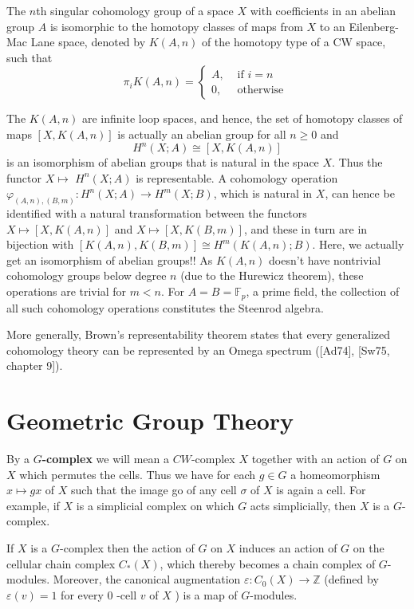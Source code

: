The $n$th singular cohomology group of a space $X$ with coefficients in an abelian group $A$ is isomorphic to the homotopy classes of maps from $X$ to an Eilenberg-Mac Lane space, denoted by $K(A, n)$ of the homotopy type of a CW space, such that
$$
\pi_i K(A, n)= \begin{cases}A, & \text { if } i=n \\ 0, & \text { otherwise }\end{cases}
$$

The $K(A, n)$ are infinite loop spaces, and hence, the set of homotopy classes of maps $[X, K(A, n)]$ is actually an abelian group for all $n \geq 0$ and
$$
H^n(X ; A) \cong[X, K(A, n)]
$$
is an isomorphism of abelian groups that is natural in the space $X$. Thus the functor $X \mapsto$ $H^n(X ; A)$ is representable. A cohomology operation $\varphi_{(A, n),(B, m)}: H^n(X ; A) \rightarrow H^m(X ; B)$, which is natural in $X$, can hence be identified with a natural transformation between the functors $X \mapsto[X, K(A, n)]$ and $X \mapsto[X, K(B, m)]$, and these in turn are in bijection with $[K(A, n), K(B, m)] \cong H^m(K(A, n) ; B)$. Here, we actually get an isomorphism of abelian groups!! As $K(A, n)$ doesn't have nontrivial cohomology groups below degree $n$ (due to the Hurewicz theorem), these operations are trivial for $m<n$. For $A=B=\mathbb{F}_p$, a prime field, the collection of all such cohomology operations constitutes the Steenrod algebra.

More generally, Brown's representability theorem states that every generalized cohomology theory can be represented by an Omega spectrum ([Ad74], [Sw75, chapter 9]).






\chapter{Geometric Group Theory}

By a \textbf{$G$-complex} we will mean a $C W$-complex $X$ together with an action of $G$ on $X$ which permutes the cells. Thus we have for each $g \in G$ a homeomorphism $x \mapsto g x$ of $X$ such that the image go of any cell $\sigma$ of $X$ is again a cell. For example, if $X$ is a simplicial complex on which $G$ acts simplicially, then $X$ is a $G$-complex.

If $X$ is a $G$-complex then the action of $G$ on $X$ induces an action of $G$ on the cellular chain complex $C_*(X)$, which thereby becomes a chain complex of $G$-modules. Moreover, the canonical augmentation $\varepsilon: C_0(X) \rightarrow \mathbb{Z}$ (defined by $\varepsilon(v)=1$ for every 0 -cell $v$ of $X$ ) is a map of $G$-modules.

